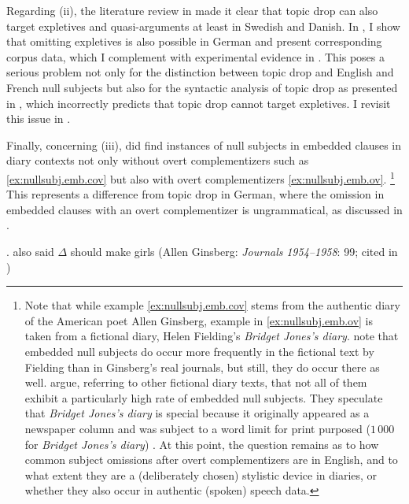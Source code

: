 Regarding (ii), the literature review in  made it clear that topic drop can also target expletives  and quasi-arguments at least in Swedish  and Danish.  
In , I show that omitting expletives is also possible in German and present corresponding corpus data, which I complement with experimental evidence in .
This poses a serious problem not only for the distinction between topic drop and English and French null subjects but also for the syntactic analysis of topic drop as presented in \citet{haegeman1990}, which incorrectly predicts that topic drop cannot target expletives. 
I revisit this issue in .

Finally, concerning (iii), \citet{haegeman.ihsane1999} did find instances of null subjects in embedded  clauses in diary contexts not only without overt complementizers  such as \ref{ex:nullsubj.emb.cov} but also with overt complementizers \ref{ex:nullsubj.emb.ov}.%
\footnote{Note that while example \ref{ex:nullsubj.emb.cov} stems from the authentic diary of the American poet Allen Ginsberg, example in \ref{ex:nullsubj.emb.ov} is taken from a fictional diary, Helen Fielding's \textit{Bridget Jones's diary}.
\citet[130--131]{haegeman.ihsane1999} note that embedded  null subjects do occur more frequently in the fictional text by Fielding than in Ginsberg's real journals, but still, they do occur there as well.
\citet[131]{haegeman.ihsane1999} argue, referring to other fictional diary texts, that not all of them exhibit a particularly high rate of embedded  null subjects.
They speculate that \textit{Bridget Jones's diary} is special because it originally appeared as a newspaper column and was subject to a word limit for print purposed ($1\,000$ for \textit{Bridget Jones's diary}) \citep[131]{haegeman.ihsane1999}.
At this point, the question remains as to how common subject omissions after overt complementizers  are in English, and to what extent they are a (deliberately chosen) stylistic device in diaries, or whether they also occur in authentic (spoken) speech data.
}
%
This represents a difference from topic drop in German, where the omission in embedded  clauses with an overt complementizer  is ungrammatical, as discussed in .

\ex.\label{ex:nullsubj.emb.cov} also said $\Delta$ should make girls (Allen Ginsberg: \textit{Journals} \textit{1954--1958}: 99; cited in \cite[128]{haegeman.ihsane1999})

